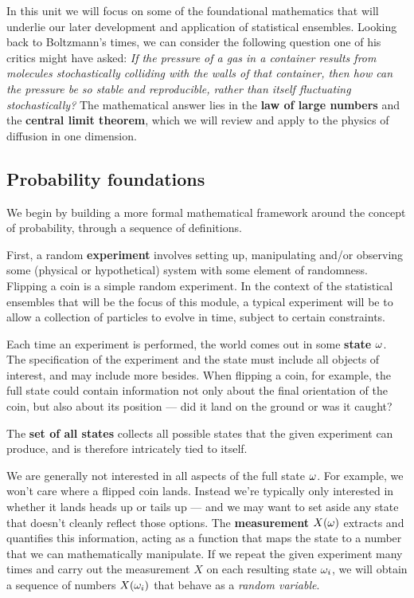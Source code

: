 In this unit we will focus on some of the foundational mathematics that will underlie our later development and application of statistical ensembles.
Looking back to Boltzmann's times, we can consider the following question one of his critics might have asked:
\textit{If the pressure of a gas in a container results from molecules stochastically colliding with the walls of that container, then how can the pressure be so stable and reproducible, rather than itself fluctuating stochastically?}
The mathematical answer lies in the \textbf{law of large numbers} and the \textbf{central limit theorem}, which we will review and apply to the physics of diffusion in one dimension.



\subsection{\label{sec:prob}Probability foundations}
We begin by building a more formal mathematical framework around the concept of probability, through a sequence of definitions.

First, a random \textbf{experiment} \cE involves setting up, manipulating and/or observing some (physical or hypothetical) system with some element of randomness.
Flipping a coin is a simple random experiment.
In the context of the statistical ensembles that will be the focus of this module, a typical experiment will be to allow a collection of particles to evolve in time, subject to certain constraints.

Each time an experiment is performed, the world comes out in some \textbf{state} $\omega$.
The specification of the experiment and the state must include all objects of interest, and may include more besides.
When flipping a coin, for example, the full state could contain information not only about the final orientation of the coin, but also about its position --- did it land on the ground or was it caught?

The \textbf{set of all states} \Om collects all possible states \om that the given experiment \cE can produce, and is therefore intricately tied to \cE itself.

We are generally not interested in all aspects of the full state $\omega$.
For example, we won't care where a flipped coin lands.
Instead we're typically only interested in whether it lands heads up or tails up --- and we may want to set aside any state that doesn't cleanly reflect those options.
The \textbf{measurement} $X(\omega)$ extracts and quantifies this information, acting as a function that maps the state \om to a number that we can mathematically manipulate.
If we repeat the given experiment \cE many times and carry out the measurement $X$ on each resulting state $\omega_i$, we will obtain a sequence of numbers $X(\omega_i)$ that behave as a \textit{random variable}.

